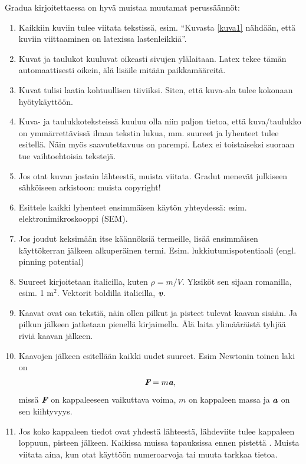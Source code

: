 Gradua kirjoitettaessa on hyvä muistaa muutamat perussäännöt:
\begin{enumerate}
\item Kaikkiin
kuviin tulee viitata tekstissä, esim. ``Kuvasta \ref{kuva1} nähdään,
että kuviin viittaaminen on latexissa lastenleikkiä''. 
\item Kuvat ja taulukot kuuluvat oikeasti sivujen ylälaitaan. Latex
  tekee tämän automaattisesti oikein, älä lisäile mitään paikkamääreitä.
\item Kuvat tulisi laatia kohtuullisen tiiviiksi. Siten, että kuva-ala
  tulee kokonaan hyötykäyttöön.
\item Kuva- ja taulukkoteksteissä kuuluu olla niin paljon tietoa, että
  kuva/taulukko on ymmärrettävissä ilman tekstin lukua, mm. suureet ja
  lyhenteet tulee esitellä. Näin myös saavutettavuus on parempi. Latex ei toistaiseksi suoraan tue vaihtoehtoisia tekstejä.
\item Jos otat kuvan jostain lähteestä, muista viitata. Gradut menevät
 julkiseen sähköiseen arkistoon: muista copyright!
\item Esittele kaikki lyhenteet ensimmäisen käytön yhteydessä:
  esim. elektronimikroskooppi (SEM).
\item Jos joudut keksimään itse käännöksiä termeille, lisää
  ensimmäisen käyttökerran jälkeen alkuperäinen
  termi. Esim. lukkiutumispotentiaali (engl. pinning potential)
\item Suureet kirjoitetaan italicilla, kuten $\rho = m/V$. Yksiköt sen
  sijaan romanilla, esim. 1 m$^2$. Vektorit boldilla italicilla,
  $\textbf{\em v}$.
\item Kaavat ovat osa tekstiä, näin ollen pilkut ja pisteet tulevat
  kaavan sisään. Ja pilkun jälkeen jatketaan pienellä kirjaimella. Älä laita ylimääräistä tyhjää riviä kaavan jälkeen.
\item Kaavojen jälkeen esitellään kaikki uudet suureet. Esim Newtonin
  toinen laki on 
\begin{equation}
\textbf{\em F} = m\textbf{\em a},
\end{equation}
missä $\textbf{\em F}$ on kappaleeseen vaikuttava voima, $m$ on kappaleen
massa ja $\textbf{\em a}$ on sen kiihtyvyys.
\item Jos koko kappaleen tiedot ovat yhdestä lähteestä, lähdeviite
  tulee kappaleen loppuun, pisteen jälkeen. Kaikissa muissa
  tapauksissa ennen pistettä \cite{BHcurve}. Muista viitata aina, kun otat käyttöön 
  numeroarvoja tai muuta tarkkaa tietoa.\cite{COEY2020119}

\end{enumerate}

